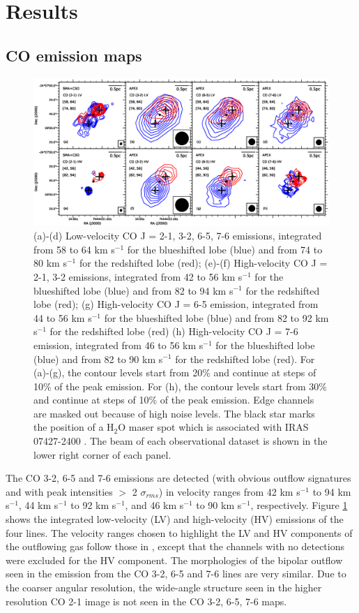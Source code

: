 \section{Results}
\subsection{CO emission maps}

\begin{figure}[htbp]
\includegraphics[scale=.65]{./fig/ori_contourall.eps}
\caption{(a)-(d) Low-velocity CO J = 2-1, 3-2, 6-5, 7-6 emissions, integrated from 58 to 64 km s$^{-1} $ for the blueshifted lobe (blue) and from 74 to 80 km s$^{-1}$ for the redshifted lobe (red); (e)-(f) High-velocity CO J = 2-1, 3-2 emissions,  integrated from 42 to 56 km s$^{-1} $ for the blueshifted lobe (blue) and from 82 to 94 km s$^{-1}$ for the redshifted lobe (red); (g) High-velocity CO J = 6-5 emission, integrated from 44 to 56 km s$^{-1} $ for the blueshifted lobe (blue) and from 82 to 92 km s$^{-1}$ for the redshifted lobe (red) (h) High-velocity CO J = 7-6 emission, integrated from 46 to 56 km s$^{-1} $ for the blueshifted lobe (blue) and from 82 to 90 km s$^{-1}$ for the redshifted lobe (red). For (a)-(g), the contour levels start from 20\% and continue at steps of 10\% of the peak emission. For (h), the contour levels start from 30\% and continue at steps of 10\% of the peak emission. Edge channels are masked out because of high noise levels. The black star marks the position of a H$_2$O maser spot which is associated with IRAS 07427-2400 \citep{2015PASJ...67...69S}. The beam of each observational dataset is shown in the lower right corner of each panel. \label{fig:figcontour}}
\end{figure}

The CO 3-2, 6-5 and 7-6 emissions are detected (with obvious outflow signatures and with peak intensities $>$ 2 $\sigma_{rms}$) in velocity ranges from 42 km s$^{-1}$ to 94 km s$^{-1}$, 44 km s$^{-1}$ to 92 km s$^{-1}$, and 46 km s$^{-1}$ to 90 km s$^{-1}$, respectively. Figure \ref{fig:figcontour} shows the integrated low-velocity (LV) and high-velocity (HV) emissions of the four lines. The velocity ranges chosen to highlight the LV and HV components of the outflowing gas follow those in \citet{2009ApJ...696...66Q}, except that the channels with no detections were excluded for the HV component. The morphologies of the bipolar outflow seen in the emission from the CO 3-2, 6-5 and 7-6 lines are very similar. Due to the coarser angular resolution, the wide-angle structure seen in the higher resolution CO 2-1 image is not seen in the CO 3-2, 6-5, 7-6 maps.

